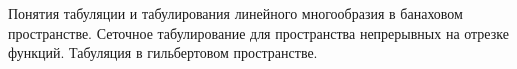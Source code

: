 \documentclass[__main__.tex]{subfiles}
\begin{document}
Понятия табуляции и табулирования линейного многообразия в банаховом пространстве. Сеточное табулирование для пространства непрерывных на отрезке функций. Табуляция в гильбертовом пространстве.\\
\end{document}
